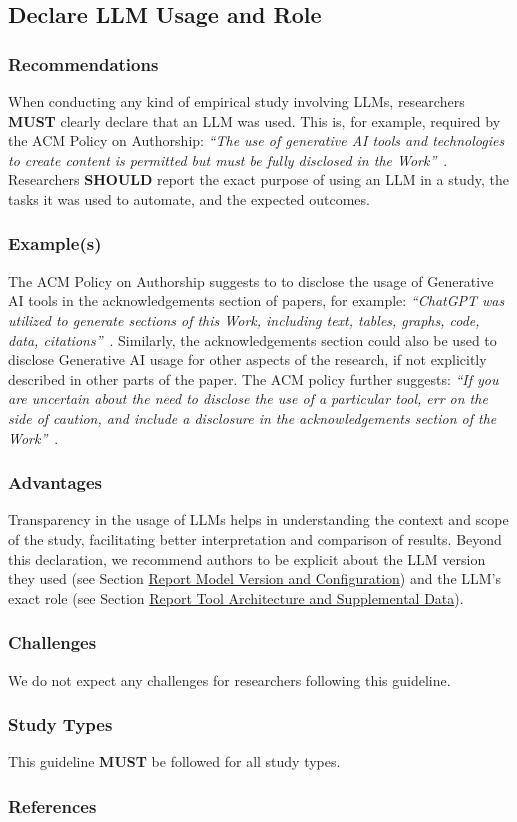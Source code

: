 \documentclass[11pt]{article}
\newcommand{\must}{\textbf{MUST}\xspace}
\newcommand{\should}{\textbf{SHOULD}\xspace}
\begin{document}
\subsection{Declare LLM Usage and Role}

\subsubsection{Recommendations}

When conducting any kind of empirical study involving LLMs, researchers \must clearly declare that an LLM was used.
This is, for example, required by the ACM Policy on Authorship: \emph{``The use of generative AI tools and technologies to create content is permitted but must be fully disclosed in the Work''}~\cite{ACM2023}.
Researchers \should report the exact purpose of using an LLM in a study, the tasks it was used to automate, and the expected outcomes.


\subsubsection{Example(s)}

The ACM Policy on Authorship suggests to to disclose the usage of Generative AI tools in the acknowledgements section of papers, for example: \emph{``ChatGPT was utilized to generate sections of this Work, including text, tables, graphs, code, data, citations''}~\cite{ACM2023}. 
Similarly, the acknowledgements section could also be used to disclose Generative AI usage for other aspects of the research, if not explicitly described in other parts of the paper.
The ACM policy further suggests: \emph{``If you are uncertain ­about the need to disclose the use of a particular tool, err on the side of caution, and include a disclosure in the acknowledgements section of the Work''}~\cite{ACM2023}.


\subsubsection{Advantages}

Transparency in the usage of LLMs helps in understanding the context and scope of the study, facilitating better interpretation and comparison of results.
Beyond this declaration, we recommend authors to be explicit about the LLM version they used (see Section \href{/guidelines/#report-model-version-and-configuration}{Report Model Version and Configuration}) and the LLM's exact role (see Section \href{/guidelines/#report-tool-architecture-and-supplemental-data}{Report Tool Architecture and Supplemental Data}).


\subsubsection{Challenges}

We do not expect any challenges for researchers following this guideline.


\subsubsection{Study Types}

This guideline \must be followed for all study types.


\subsubsection{References}



\end{document}
